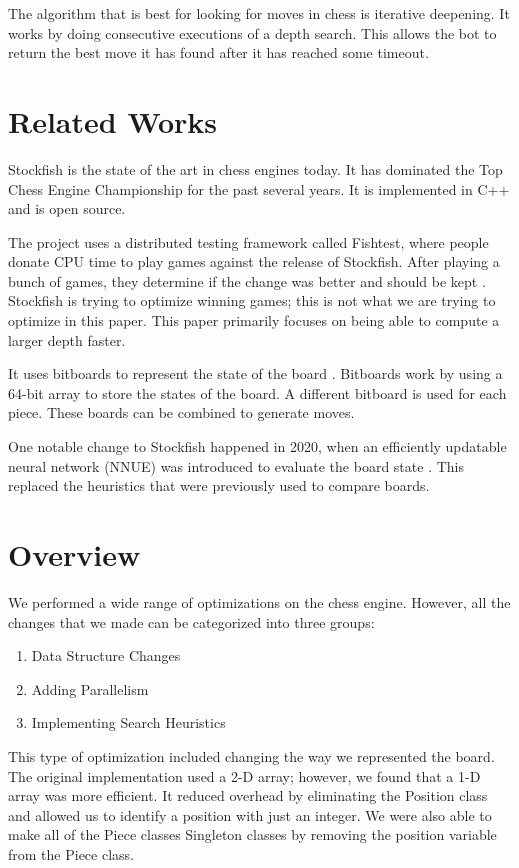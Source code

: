 \documentclass[sigconf]{acmart}
\begin{document}
The algorithm that is best for looking for moves in chess is iterative deepening.
It works by doing consecutive executions of a depth search.
This allows the bot to return the best move it has found after it has reached some timeout.

\section{Related Works}
Stockfish \cite{stockfish} is the state of the art in chess engines today.
It has dominated the Top Chess Engine Championship for the past several years. It is implemented in C++ and is open source.

The project uses a distributed testing framework called Fishtest, where people donate CPU time to play games against the release of Stockfish.
After playing a bunch of games, they determine if the change was better and should be kept \cite{stockwiki}.
Stockfish is trying to optimize winning games; this is not what we are trying to optimize in this paper.
This paper primarily focuses on being able to compute a larger depth faster.

It uses bitboards to represent the state of the board \cite{stockwiki}.
Bitboards work by using a 64-bit array to store the states of the board.
A different bitboard is used for each piece.
These boards can be combined to generate moves.

One notable change to Stockfish happened in 2020, when an efficiently updatable neural network (NNUE) was introduced to evaluate the board state \cite{chesswiki}.
This replaced the heuristics that were previously used to compare boards.

\section{Overview}
We performed a wide range of optimizations on the chess engine.
However, all the changes that we made can be categorized into three groups:
\begin{enumerate}
    \item Data Structure Changes
    \item Adding Parallelism
    \item Implementing Search Heuristics
\end{enumerate}

This type of optimization included changing the way we represented the board.
The original implementation used a 2-D array; however, we found that a 1-D array was more efficient.
It reduced overhead by eliminating the Position class and allowed us to identify a position with just an integer.
We were also able to make all of the Piece classes Singleton classes by removing the position variable from the Piece class.
\end{document}
